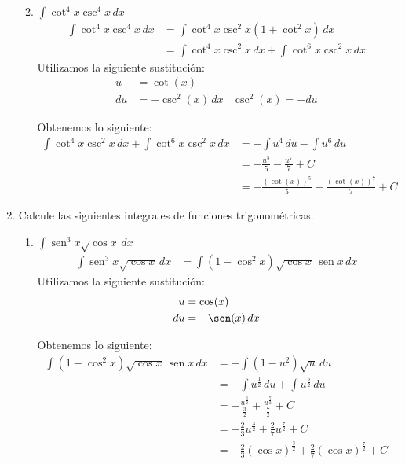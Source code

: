\documentclass[a4paper,10pt]{article}
\newcommand{\dis}{\displaystyle}
\def\sin{\operatorname{sen}}
\begin{document}
\begin{enumerate}
\begin{enumerate}[label=\emph{\alph*)}]
\newpage
\item $\dis \int \cot^4 x\csc^4 x\, dx$
\begin{align*}
 \dis \int \cot^4 x\csc^4 x\, dx  &=    \dis \int \cot^4 x\csc^2 x(1+\cot^2 x)\, dx\\
 										 &=    \dis \int \cot^4 x\csc^2 x\, dx +\dis \int \cot^6 x\csc^2 x\, dx
\end{align*}
Utilizamos la siguiente sustitución:
\begin{align*}
u  &= \cot(x)    &  \\
du &= -\csc^2(x)  \, dx  & \csc^2 (x) = -du
\end{align*}
\dotfill [1 punto]

Obtenemos lo siguiente:
\begin{align*}
 \dis \int \cot^4 x\csc^2 x\, dx +\dis \int \cot^6 x\csc^2 x\, dx  &=    -\dis \int u^4 \, du -\dis \int u^6 \, du\\
 										 &=    -\dis \frac{u^5}{5} -\dis \frac{u^7}{7} + C\\
                                          &=    -\dis \frac{(\cot (x))^5}{5} -\dis \frac{(\cot (x))^7}{7} + C
\end{align*}
\dotfill [1 punto]

\end{enumerate}


\newpage
\item Calcule las siguientes integrales de funciones
trigonom\'{e}tricas.
\begin{enumerate}[label=\emph{\alph*)}]
\item $\dis \int \sin^3 x\sqrt{\cos x}\, dx$
\begin{align*}
 \dis \int \sin^3 x\sqrt{\cos x}\, dx  &=    \dis \int (1-\cos^2 x)\sqrt{\cos x}\, \sin x \, dx
\end{align*}
Utilizamos la siguiente sustitución:
\begin{align*}
u  &= \cos(x)      \\
du &= -\sen(x)  \, dx
\end{align*}
\dotfill [1 punto]

Obtenemos lo siguiente:
\begin{align*}
 \dis \int (1-\cos^2 x)\sqrt{\cos x}\, \sin x \, dx  &=    -\dis \int (1-u^2)\sqrt{u} \, du\\
 													 &=    \dis -\int u^{\frac{1}{2}} \, du + \int u^{\frac{5}{2}} \, du\\
                                                     &=    \dis -\frac{u^{\frac{3}{2}}}{\frac{3}{2}} + \frac{u^{\frac{7}{2}}}{\frac{7}{2}} + C\\
                                                     &=    \dis -\frac{2}{3}u^{\frac{3}{2}} + \frac{2}{7}u^{\frac{7}{2}} + C\\
                                                     &=    \dis -\frac{2}{3}(\cos x)^{\frac{3}{2}} + \frac{2}{7}(\cos x)^{\frac{7}{2}} + C\\
\end{align*}
\dotfill [1 punto]



\end{enumerate}
\end{enumerate}
\end{document}
